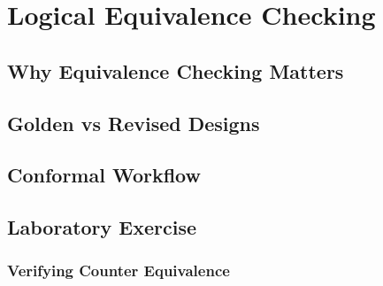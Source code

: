 \chapter{Logical Equivalence Checking}

\section{Why Equivalence Checking Matters}

\section{Golden vs Revised Designs}

\section{Conformal Workflow}

\section{Laboratory Exercise}

\subsection*{Verifying Counter Equivalence}
